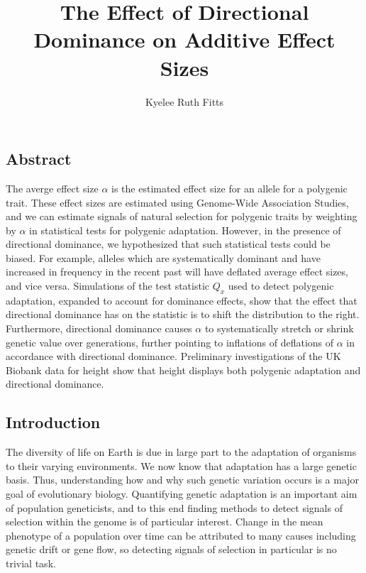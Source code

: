 \documentclass[a4paper,12pt]{article}
\begin{document}
\title{\vspace{-2cm}
  The Effect of Directional Dominance on Additive Effect Sizes
}
\author{Kyelee Ruth Fitts}
\maketitle


\subsection*{Abstract}
The averge effect size $\alpha$ is the estimated effect size for an
allele for a polygenic trait. These effect sizes are estimated using
Genome-Wide Association Studies, and we can estimate signals of natural
selection for polygenic traits by weighting by $\alpha$ in statistical
tests for polygenic adaptation. However, in the presence of
directional dominance, we hypothesized that such statistical tests
could be biased. For example, alleles which are systematically
dominant and have increased in frequency in the recent past will have
deflated average effect sizes, and vice versa. Simulations of the test
statistic $Q_x$ used to detect polygenic adaptation, expanded to
account for dominance effects, show that the effect that directional
dominance has on the statistic is to shift the distribution to the
right. Furthermore, directional dominance causes $\alpha$ to
systematically stretch or shrink genetic value over generations,
further pointing to inflations of deflations of $\alpha$ in accordance
with directional dominance. Preliminary investigations of the UK
Biobank data for height show that height displays both polygenic
adaptation and directional dominance.


\subsection*{Introduction}

The diversity of life on Earth is due in large part to the
adaptation of organisms to their varying environments. We now know that
adaptation has a large genetic basis. Thus, understanding how and why such
genetic variation occurs is a major goal of evolutionary
biology. Quantifying genetic adaptation is an important aim of population
geneticists, and to this end finding methods to detect signals of
selection within the genome is of particular interest. Change in the
mean phenotype of a population over time can be attributed to many causes including genetic
drift or gene flow, so detecting signals of selection in
particular is no trivial task.
\end{document}
